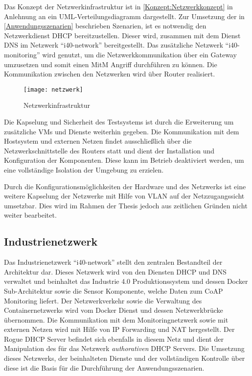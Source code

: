 Das Konzept der Netzwerkinfrastruktur ist in \autoref{Konzept:Netzwerkkonzept} in Anlehnung an ein \ac{UML}-Verteilungsdiagramm dargestellt. Zur Umsetzung der in \autoref{Anwendungsszenarien} beschrieben Szenarien, ist es notwendig den Netzwerkdienst \ac{DHCP} bereitzustellen. Dieser wird, zusammen mit dem Dienst \ac{DNS} im Netzwerk "`i40-network"' bereitgestellt. Das zusätzliche Netzwerk "`i40-monitoring"' wird genutzt, um die Netzwerkkommunikation über ein Gateway umzusetzen und somit einen \ac{MitM} Angriff durchführen zu können. Die Kommunikation zwischen den Netzwerken wird über Router realisiert.

\begin{figure}[h]
  \centering
  \texttt{[image: netzwerk]}
  \caption{Netzwerkinfrastruktur} 
  \label{Konzept:Netzwerkkonzept}
\end{figure}

\clearpage

Die Kapselung und Sicherheit des Testsystems ist durch die Erweiterung um zusätzliche \ac{VM}s und Dienste weiterhin gegeben. Die Kommunikation mit dem Hostsystem und externen Netzen findet ausschließlich über die Netzwerkschnittstelle des Routers statt und dient der Installation und Konfiguration der Komponenten. Diese kann im Betrieb deaktiviert werden, um eine vollständige Isolation der Umgebung zu erzielen.

Durch die Konfigurationsmöglichkeiten der Hardware und des Netzwerks ist eine weitere Kapselung der Netzwerke mit Hilfe von \ac{VLAN} auf der Netzzugangssicht umsetzbar. Dies wird im Rahmen der Thesis jedoch aus zeitlichen Gründen nicht weiter bearbeitet.

\subsection{Industrienetzwerk}
Das Industrienetzwerk "`i40-network"' stellt den zentralen Bestandteil der Architektur dar. Dieses Netzwerk wird von den Diensten \ac{DHCP} und \ac{DNS} verwaltet und beinhaltet das Industrie 4.0 Produktionssystem und dessen Docker Sub-Architektur sowie die Sensor Komponente, welche Daten zum \ac{CoAP} Monitoring liefert. Der Netzwerkverkehr sowie die Verwaltung des Containernetzwerks wird vom Docker Dienst und dessen Netzwerkbrücke übernommen. Die Kommunikation mit dem Monitoringnetzwerk sowie mit externen Netzen wird mit Hilfe von \ac{IP} Forwarding und \ac{NAT} hergestellt. Der Rogue \ac{DHCP} Server befindet sich ebenfalls in diesem Netz und dient der Manipulation des für das Netzwerk \textit{authorativen} \ac{DHCP} Servers. Die Umsetzung dieses Netzwerks, der beinhalteten Dienste und der vollständigen Kontrolle über diese ist die Basis für die Durchführung der Anwendungsszenarien.

